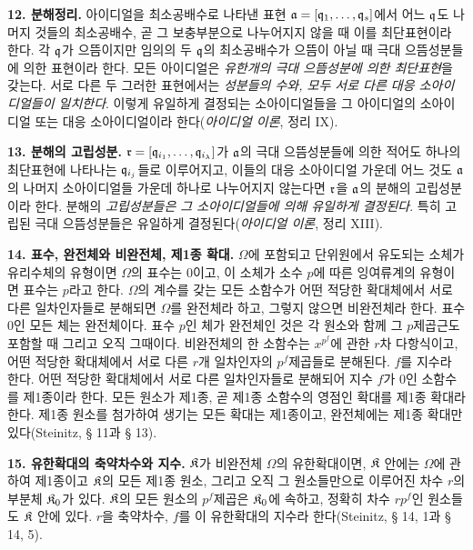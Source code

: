 \textbf{12. 분해정리.} 아이디얼을 최소공배수로 나타낸 표현 \(\mathfrak a=[\mathfrak q_1,\ldots,\mathfrak q_s]\)에서 어느 \(\mathfrak q\)도 나머지 것들의 최소공배수, 곧 그 보충부분으로 나누어지지 않을 때 이를 최단표현이라 한다. 각 \(\mathfrak q\)가 으뜸이지만 임의의 두 \(\mathfrak q\)의 최소공배수가 으뜸이 아닐 때 극대 으뜸성분들에 의한 표현이라 한다. 모든 아이디얼은 \emph{유한개의 극대 으뜸성분에 의한 최단표현}을 갖는다. 서로 다른 두 그러한 표현에서는 \emph{성분들의 수와, 모두 서로 다른 대응 소아이디얼들이 일치한다}. 이렇게 유일하게 결정되는 소아이디얼들을 그 아이디얼의 소아이디얼 또는 대응 소아이디얼이라 한다(\emph{아이디얼 이론}, 정리 IX).

\textbf{13. 분해의 고립성분.} \(\mathfrak r=[\mathfrak q_{i_1},\ldots,\mathfrak q_{i_\lambda}]\)가 \(\mathfrak a\)의 극대 으뜸성분들에 의한 적어도 하나의 최단표현에 나타나는 \(\mathfrak q_{i_j}\)들로 이루어지고, 이들의 대응 소아이디얼 가운데 어느 것도 \(\mathfrak a\)의 나머지 소아이디얼들 가운데 하나로 나누어지지 않는다면 \(\mathfrak r\)을 \(\mathfrak a\)의 분해의 고립성분이라 한다. 분해의 \emph{고립성분들은 그 소아이디얼들에 의해 유일하게 결정된다}. 특히 고립된 극대 으뜸성분들은 유일하게 결정된다(\emph{아이디얼 이론}, 정리 XIII).

\textbf{14. 표수, 완전체와 비완전체, 제1종 확대.} \(\Omega\)에 포함되고 단위원에서 유도되는 소체가 유리수체의 유형이면 \(\Omega\)의 표수는 0이고, 이 소체가 소수 \(p\)에 따른 잉여류계의 유형이면 표수는 \(p\)라고 한다. \(\Omega\)의 계수를 갖는 모든 소함수가 어떤 적당한 확대체에서 서로 다른 일차인자들로 분해되면 \(\Omega\)를 완전체라 하고, 그렇지 않으면 비완전체라 한다. 표수 0인 모든 체는 완전체이다. 표수 \(p\)인 체가 완전체인 것은 각 원소와 함께 그 \(p\)제곱근도 포함할 때 그리고 오직 그때이다. 비완전체의 한 소함수는 \(x^{p^f}\)에 관한 \(r\)차 다항식이고, 어떤 적당한 확대체에서 서로 다른 \(r\)개 일차인자의 \(p^f\)제곱들로 분해된다. \(f\)를 지수라 한다. 어떤 적당한 확대체에서 서로 다른 일차인자들로 분해되어 지수 \(f\)가 0인 소함수를 제1종이라 한다. 모든 원소가 제1종, 곧 제1종 소함수의 영점인 확대를 제1종 확대라 한다. 제1종 원소를 첨가하여 생기는 모든 확대는 제1종이고, 완전체에는 제1종 확대만 있다(Steinitz, § 11과 § 13).

\textbf{15. 유한확대의 축약차수와 지수.} \(\mathfrak K\)가 비완전체 \(\Omega\)의 유한확대이면, \(\mathfrak K\) 안에는 \(\Omega\)에 관하여 제1종이고 \(\mathfrak K\)의 모든 제1종 원소, 그리고 오직 그 원소들만으로 이루어진 차수 \(r\)의 부분체 \(\mathfrak K_0\)가 있다. \(\mathfrak K\)의 모든 원소의 \(p^f\)제곱은 \(\mathfrak K_0\)에 속하고, 정확히 차수 \(rp^f\)인 원소들도 \(\mathfrak K\) 안에 있다. \(r\)을 축약차수, \(f\)를 이 유한확대의 지수라 한다(Steinitz, § 14, 1과 § 14, 5).

